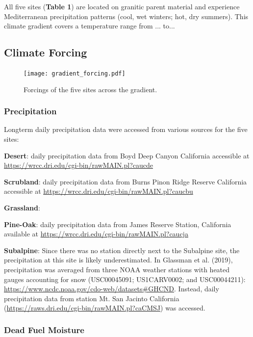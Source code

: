 \documentclass[letterpaper, 10pt]{article}
\begin{document}
All five sites (\textbf{Table 1}) are located on granitic parent material and experience Mediterranean precipitation patterns (cool, wet winters; hot, dry summers). This climate gradient covers a temperature range from ... to...



\subsection{\large Climate Forcing}

\begin{figure}[h]
\centering
      \texttt{[image: gradient\_forcing.pdf]}
      \caption{Forcings of the five sites across the gradient.}
      \label{fig: figure 2}
\end{figure}

\subsubsection{Precipitation}
Longterm daily precipitation data were accessed from various sources for the five sites:

\textbf{Desert}: daily precipitation data from Boyd Deep Canyon California accessible at \url{https://wrcc.dri.edu/cgi-bin/rawMAIN.pl?caucde}

\textbf{Scrubland}: daily precipitation data from Burns Pinon Ridge Reserve California accessible at \url{https://wrcc.dri.edu/cgi-bin/rawMAIN.pl?caucbu}

\textbf{Grassland}:

\textbf{Pine-Oak}: daily precipitation data from James Reserve Station, California available at \url{https://wrcc.dri.edu/cgi-bin/rawMAIN.pl?caucja}

\textbf{Subalpine}: Since there was no station directly next to the Subalpine site, the precipitation at this site is likely underestimated. In Glassman et al. (2019), precipitation was averaged from three NOAA weather stations with heated gauges accounting for snow (USC00045091; US1CARV0002; and USC00044211): \url{https://www.ncdc.noaa.gov/cdo-web/datasets#GHCND}. Instead, daily precipitation data from station Mt. San Jacinto California (\url{https://raws.dri.edu/cgi-bin/rawMAIN.pl?caCMSJ}) was accessed.

\subsubsection{Dead Fuel Moisture}
\end{document}
